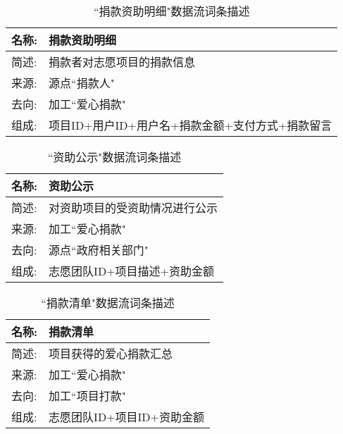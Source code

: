 \begin{table}[H]  
\caption{``捐款资助明细"数据流词条描述}  
\begin{center}  
    \begin{tabular}{l p{11cm}} 
        \hline
        \quad 名称:  &   捐款资助明细 \\
        \hline
        \quad 简述:  & 捐款者对志愿项目的捐款信息 \\
        \hline
        \quad 来源:  & 源点``捐款人" \\
        \hline
        \quad 去向:  & 加工``爱心捐款" \\
        \hline
        \quad 组成:  & 项目ID+用户ID+用户名+捐款金额+支付方式+捐款留言  \\
        \hline
    \end{tabular}
    \label{tab1}
\end{center}
\end{table}

\begin{table}[H]  
\caption{``资助公示"数据流词条描述}  
\begin{center}  
    \begin{tabular}{l p{11cm}} 
        \hline
        \quad 名称:  &   资助公示 \\
        \hline
        \quad 简述:  & 对资助项目的受资助情况进行公示 \\
        \hline
        \quad 来源:  & 加工``爱心捐款" \\
        \hline
        \quad 去向:  & 源点``政府相关部门" \\
        \hline
        \quad 组成:  & 志愿团队ID+项目描述+资助金额  \\
        \hline
    \end{tabular}
    \label{tab1}
\end{center}
\end{table}

\begin{table}[H]  
\caption{``捐款清单"数据流词条描述}  
\begin{center}  
    \begin{tabular}{l p{11cm}} 
        \hline
        \quad 名称:  &  捐款清单 \\
        \hline
        \quad 简述:  & 项目获得的爱心捐款汇总 \\
        \hline
        \quad 来源:  & 加工``爱心捐款" \\
        \hline
        \quad 去向:  &  加工``项目打款"\\
        \hline
        \quad 组成:  & 志愿团队ID+项目ID+资助金额  \\
        \hline
    \end{tabular}
    \label{tab1}
\end{center}
\end{table}

